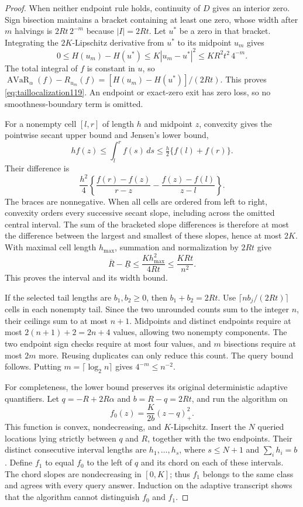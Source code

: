 \begin{proof}
When neither endpoint rule holds, continuity of $D$ gives an interior
zero.  Sign bisection maintains a bracket containing at least one zero,
whose width after $m$ halvings is $2Rt\,2^{-m}$ because $|I|=2Rt$.
Let $u^*$ be a zero in that bracket.  Integrating the $2K$-Lipschitz
derivative from $u^*$ to its midpoint $u_m$ gives
\[
 0\le H(u_m)-H(u^*)
 \le K|u_m-u^*|^2
 \le KR^2t^2\,4^{-m}.
\]
The total integral of $f$ is constant in $u$, so
$\operatorname{AVaR}_\alpha(f)-R_{u_m}(f)
 =[H(u_m)-H(u^*)]/(2Rt)$.
This proves \eqref{eq:taillocalization119}.  An endpoint or exact-zero
exit has zero loss, so no smoothness-boundary term is omitted.

For a nonempty cell $[l,r]$ of length $h$ and midpoint $z$, convexity
gives the pointwise secant upper bound and Jensen's lower bound,
\[
 h f(z)\le\int_l^r f(s)\,ds
       \le\tfrac h2\{f(l)+f(r)\}.
\]
Their difference is
\[
 \frac{h^2}{4}\left\{
       \frac{f(r)-f(z)}{r-z}-\frac{f(z)-f(l)}{z-l}\right\}.
\]
The braces are nonnegative.  When all cells are ordered from left
to right, convexity orders every successive secant slope, including
across the omitted central interval.  The sum of the bracketed slope
differences is therefore at most the difference between the largest
and smallest of these slopes, hence at most $2K$.  With maximal
cell length $h_{\max}$, summation and normalization by $2Rt$ give
\[
 \overline R-\underline R
 \le\frac{K h_{\max}^2}{4Rt}
 \le\frac{KRt}{n^2}.
\]
This proves the interval and its width bound.

If the selected tail lengths are $b_1,b_2\ge0$, then
$b_1+b_2=2Rt$.  Use $\lceil nb_j/(2Rt)\rceil$ cells in each
nonempty tail.  Since the two unrounded counts sum to the integer
$n$, their ceilings sum to at most $n+1$.  Midpoints and distinct
endpoints require at most $2(n+1)+2=2n+4$ values, allowing two
nonempty components.  The two endpoint sign checks require at most
four values, and $m$ bisections require at most $2m$ more.  Reusing
duplicates can only reduce this count.  The query bound follows.
Putting $m=\lceil\log_2n\rceil$ gives $4^{-m}\le n^{-2}$.

For completeness, the lower bound preserves its original deterministic
adaptive quantifiers.  Let $q=-R+2R\alpha$ and $b=R-q=2Rt$,
and run the algorithm on
\[
 f_0(z)=\frac{K}{2b}(z-q)_+^2.
\]
This function is convex, nondecreasing, and $K$-Lipschitz.  Insert
the $N$ queried locations lying strictly between $q$ and $R$, together
with the two endpoints.  Their distinct consecutive interval lengths
are $h_1,\ldots,h_s$, where $s\le N+1$ and $\sum_i h_i=b$.
Define $f_1$ to equal $f_0$ to the left of $q$ and its chord on each
of these intervals.  The chord slopes are nondecreasing in $[0,K]$;
thus $f_1$ belongs to the same class and agrees with every query
answer.  Induction on the adaptive transcript shows that the algorithm
cannot distinguish $f_0$ and $f_1$.


\end{proof}
